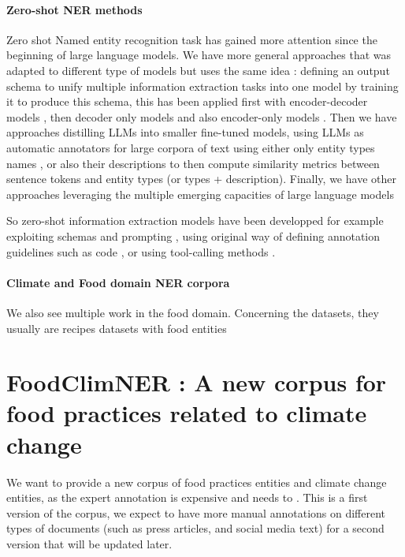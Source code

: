 \documentclass[11pt]{article}
\begin{document}
\paragraph{Zero-shot NER methods}
Zero shot Named entity recognition task has gained more attention since the beginning of large language models. We have more general approaches that was adapted to different type of models but uses the same idea : defining an output schema to unify multiple information extraction tasks into one model by training it to produce this schema, this has been applied first with encoder-decoder models \cite{luUnifiedStructureGeneration2022,louUniversalInformationExtraction2023}, then decoder only models \cite{wangInstructUIEMultitaskInstruction2023} and also encoder-only models \cite{zaratianaGLiNER2SchemaDrivenMultiTask2025}.
Then we have approaches distilling LLMs into smaller fine-tuned models, using LLMs as automatic annotators for large corpora of text using either only entity types names \cite{zaratianaGLiNERGeneralistModel2023, zhouUniversalNERTargetedDistillation2024} , or also their descriptions \cite{alyLeveragingTypeDescriptions2021, cocchieriZeroNERFuelingZeroShot2025} to then compute similarity metrics between sentence tokens and entity types (or types + description). Finally, we have other approaches leveraging the multiple emerging capacities of large language models

 So zero-shot information extraction models have been developped for example exploiting schemas and prompting , using original way of defining annotation guidelines such as code \cite{sainzGoLLIEAnnotationGuidelines2024}, or using tool-calling methods \cite{xieEmpiricalStudyZeroShot2023}.

\paragraph{Climate and Food domain NER corpora} 

We also see multiple work in the food domain. Concerning the datasets, they usually are recipes datasets with food entities \cite{}

\section{FoodClimNER : A new corpus for food practices related to climate change}

We want to provide a new corpus of food practices entities and climate change entities, as the expert annotation is expensive and needs to . This is a first version of the corpus, we expect to have more manual annotations on different types of documents (such as press articles, and social media text) for a second version that will be updated later. 
\end{document}
